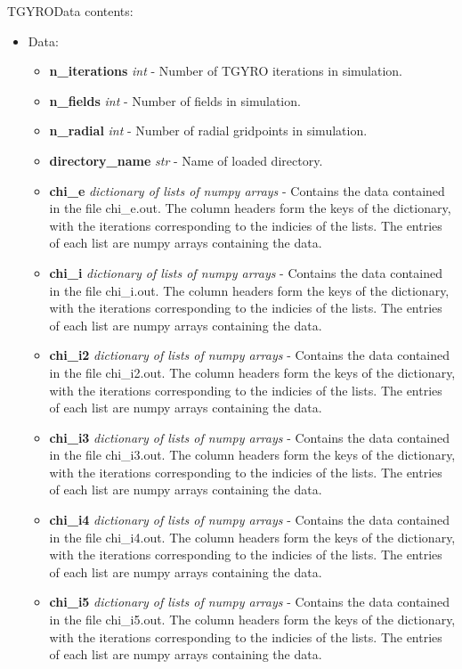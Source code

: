 \documentclass{article}
\begin{document}
\newpage
TGYROData contents:
\begin{itemize}
\item Data:
\begin{itemize}
\item \textbf{n\_iterations} \emph{int} - Number of TGYRO iterations in simulation.
\item \textbf{n\_fields} \emph{int} - Number of fields in simulation.
\item \textbf{n\_radial} \emph{int} - Number of radial gridpoints in simulation.
\item \textbf{directory\_name} \emph{str} - Name of loaded directory.
\item \textbf{chi\_e} \emph{dictionary of lists of numpy arrays} - Contains the data contained in the file chi\_e.out.  The column headers form the keys of the dictionary, with the iterations corresponding to the indicies of the lists.  The entries of each list are numpy arrays containing the data.
\item \textbf{chi\_i} \emph{dictionary of lists of numpy arrays} - Contains the data contained in the file chi\_i.out.  The column headers form the keys of the dictionary, with the iterations corresponding to the indicies of the lists.  The entries of each list are numpy arrays containing the data.
\item \textbf{chi\_i2} \emph{dictionary of lists of numpy arrays} - Contains the data contained in the file chi\_i2.out.  The column headers form the keys of the dictionary, with the iterations corresponding to the indicies of the lists.  The entries of each list are numpy arrays containing the data.
\item \textbf{chi\_i3} \emph{dictionary of lists of numpy arrays} - Contains the data contained in the file chi\_i3.out.  The column headers form the keys of the dictionary, with the iterations corresponding to the indicies of the lists.  The entries of each list are numpy arrays containing the data.
\item \textbf{chi\_i4} \emph{dictionary of lists of numpy arrays} - Contains the data contained in the file chi\_i4.out.  The column headers form the keys of the dictionary, with the iterations corresponding to the indicies of the lists.  The entries of each list are numpy arrays containing the data.
\item \textbf{chi\_i5} \emph{dictionary of lists of numpy arrays} - Contains the data contained in the file chi\_i5.out.  The column headers form the keys of the dictionary, with the iterations corresponding to the indicies of the lists.  The entries of each list are numpy arrays containing the data.

\end{itemize}
\end{itemize}
\end{document}
